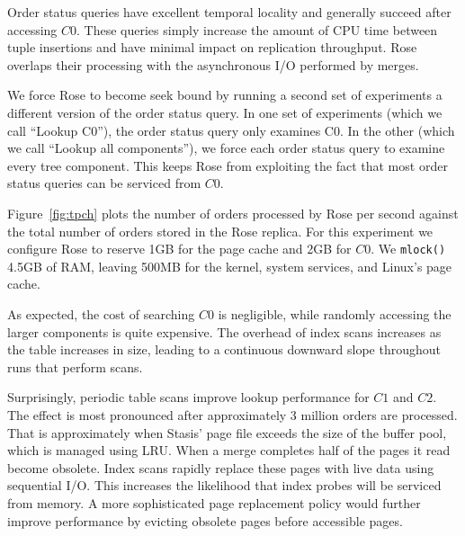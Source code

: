 \documentclass{vldb}
\newcommand{\rows}{Rose\xspace}
\newcommand{\rowss}{Rose's\xspace}
\begin{document}
Order status queries have excellent temporal locality and generally
succeed after accessing $C0$.  These queries simply increase the
amount of CPU time between tuple insertions and have minimal impact on
replication throughput.  \rows overlaps their processing with the
asynchronous I/O performed by merges.

We force \rows to become seek bound by running a second set of
experiments a different version of the order status query.  In one set
of experiments (which we call ``Lookup C0''), the order status query
only examines C0.  In the other (which we call ``Lookup all
components''), we force each order status query to examine every tree
component.  This keeps \rows from exploiting the fact that most order
status queries can be serviced from $C0$.


Figure~\ref{fig:tpch} plots the number of orders processed by \rows
per second against the total number of orders stored in the \rows
replica.  For this experiment we configure \rows to reserve 1GB for
the page cache and 2GB for $C0$.  We {\tt mlock()} 4.5GB of RAM, leaving
500MB for the kernel, system services, and Linux's page cache.


As expected, the cost of searching $C0$ is negligible, while randomly
accessing the larger components is quite expensive.  The overhead of
index scans increases as the table increases in size, leading to a
continuous downward slope throughout runs that perform scans.

Surprisingly, periodic table scans improve lookup
performance for $C1$ and $C2$.  The effect is most pronounced after
approximately 3 million orders are processed.  That is approximately
when Stasis' page file exceeds the size of the buffer pool, which is
managed using LRU.  When a merge completes half of the pages it read
become obsolete.  Index scans rapidly replace these pages with live
data using sequential I/O.  This increases the likelihood that index
probes will be serviced from memory.  A more sophisticated page
replacement policy would further improve performance by evicting
obsolete pages before accessible pages.
\end{document}
